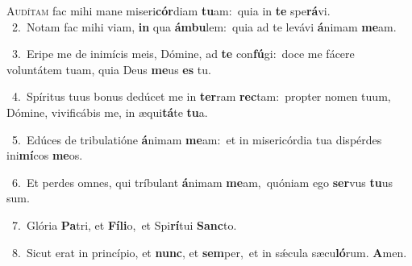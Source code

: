 \lettrine{\initial\textcolor{\initialcolor}{A}}{udítam} fac mihi mane miseri\-\textbf{cór}\-diam \textbf{tu}\-am:~\star quia in \textbf{te} spe\-\textbf{rá}\-vi.\\
{\numbfont\textcolor{\numbcolor}{~2.}}~Notam fac mihi viam, \textbf{in} qua \textbf{ám}\-\textbf{bu}lem:~\star quia ad te levávi \textbf{á}\-nimam \textbf{me}\-am.\par
{\numbfont\textcolor{\numbcolor}{~3.}}~Eripe me de inimícis meis, Dómine, ad \textbf{te} con\-\textbf{fú}\-gi:~\star doce me fácere voluntátem tuam, quia Deus \textbf{me}\-us \textbf{es} tu.\par
{\numbfont\textcolor{\numbcolor}{~4.}}~Spíritus tuus bonus dedúcet me in \textbf{ter}\-ram \textbf{rec}\-tam:~\star propter nomen tuum, Dómine, vivificábis me, in æqui\-\textbf{tá}\-te \textbf{tu}\-a.\par
{\numbfont\textcolor{\numbcolor}{~5.}}~Edúces de tribulatióne \textbf{á}\-nimam \textbf{me}\-am:~\star et in misericórdia tua dispérdes ini\-\textbf{mí}\-cos \textbf{me}\-os.\par
{\numbfont\textcolor{\numbcolor}{~6.}}~Et perdes omnes, qui tríbulant \textbf{á}\-nimam \textbf{me}\-am,~\star quóniam ego \textbf{ser}\-vus \textbf{tu}\-us sum.\par
{\numbfont\textcolor{\numbcolor}{~7.}}~Glória \textbf{Pa}\-tri, et \textbf{Fí}\-\textbf{li}o,~\star et Spi\-\textbf{rí}\-tui \textbf{Sanc}\-to.\par
{\numbfont\textcolor{\numbcolor}{~8.}}~Sicut erat in princípio, et \textbf{nunc}\-, et \textbf{sem}\-per,~\star et in sǽcula sæcu\-\textbf{ló}\-rum. \textbf{A}\-men.\par
